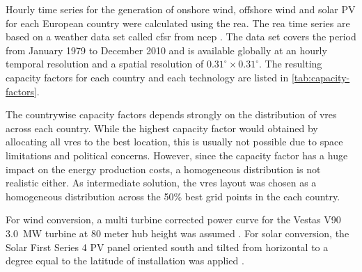 \documentclass[a4paper, 5p, sort&compress]{elsarticle}%
\begin{document}
Hourly time series for the generation of onshore wind, offshore wind and solar PV for each
European country were calculated using the \gls{rea}. The \gls{rea} time series are based on a
weather data set called \gls{cfsr} from \gls{ncep} \cite{Saha}. The data set covers the period
from January 1979 to December 2010 and is available globally at an hourly temporal resolution
and a spatial resolution of $0.31^\circ \times 0.31^\circ$.
The resulting capacity factors for each country and each technology are listed in
\cref{tab:capacity-factors}.

The countrywise capacity factors depends strongly on the distribution of \gls{vres} across each
country. While the highest capacity factor would obtained by allocating all \gls{vres} to the
best location, this is usually not possible due to space limitations and political
concerns. However, since the capacity factor has a huge impact on the energy production costs,
a homogeneous distribution is not realistic either. As intermediate solution, the \gls{vres}
layout was chosen as a homogeneous distribution across the 50\% best grid points in the each
country.

For wind conversion, a multi turbine
corrected power curve for the Vestas V90 3.0~MW turbine at 80 meter
hub height was assumed \cite{REA}. For solar conversion, the Solar First Series 4
PV panel oriented south and tilted from horizontal to a degree equal
to the latitude of installation was applied \cite{?}. %
\end{document}
